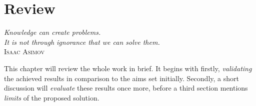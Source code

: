 %
%
%
%
%
%
%

\chapter{Review}
\label{review_heading}

\begin{flushright}
    \textsl{
        Knowledge can create problems.\\
        It is not through ignorance that we can solve them.
    }\\
    \textsc{Isaac Asimov}
\end{flushright}

This chapter will review the whole work in brief. It begins with firstly,
\emph{validating} the achieved results in comparison to the aims set initially.
Secondly, a short discussion will \emph{evaluate} these results once more,
before a third section mentions \emph{limits} of the proposed solution.




